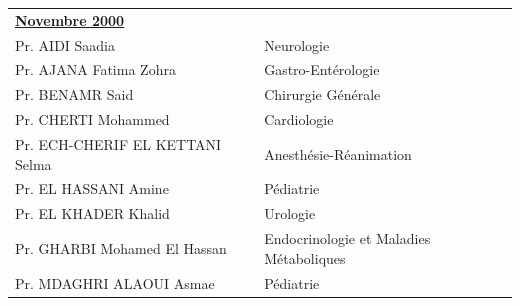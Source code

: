       \begin{table}[H]

        \begin{tabular}{l l}
         \multicolumn{2}{l}{\textbf{\underline{Novembre 2000}}}\vspace*{0.5em}\\
         Pr. AIDI Saadia & \hspace*{2em} Neurologie\\
         Pr. AJANA Fatima Zohra & \hspace*{2em} Gastro-Entérologie  \\
         Pr. BENAMR Said & \hspace*{2em} Chirurgie Générale\\
         Pr. CHERTI Mohammed	& \hspace*{2em} Cardiologie \\
         Pr. ECH-CHERIF EL KETTANI Selma & \hspace*{2em} Anesthésie-Réanimation\\
         Pr. EL HASSANI Amine &  \hspace*{2em} Pédiatrie\\
         Pr. EL KHADER Khalid &  \hspace*{2em} Urologie \\
         Pr. GHARBI Mohamed El Hassan & \hspace*{2em} Endocrinologie et Maladies Métaboliques\\
         Pr. MDAGHRI ALAOUI Asmae &  \hspace*{2em} Pédiatrie \\
        \end{tabular}
        
        \end{table}

